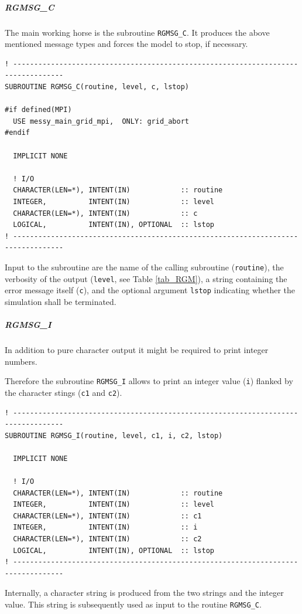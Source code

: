 \documentclass[11pt,twoside]{article}
\begin{document}
\subparagraph{RGMSG\_C\\}
The main working horse is the subroutine \verb|RGMSG_C|.
 It produces the above mentioned message types and forces the model
to stop, if necessary.
\begin{verbatim}
! ----------------------------------------------------------------------------------
SUBROUTINE RGMSG_C(routine, level, c, lstop)

#if defined(MPI)
  USE messy_main_grid_mpi,  ONLY: grid_abort
#endif

  IMPLICIT NONE

  ! I/O
  CHARACTER(LEN=*), INTENT(IN)            :: routine
  INTEGER,          INTENT(IN)            :: level
  CHARACTER(LEN=*), INTENT(IN)            :: c
  LOGICAL,          INTENT(IN), OPTIONAL  :: lstop
! ----------------------------------------------------------------------------------
\end{verbatim}
Input to the subroutine are the name of the calling subroutine 
(\verb|routine|), the verbosity of the output (\verb|level|, see Table 
\ref{tab_RGM}), a string containing the error message itself (\verb|c|),
and the optional argument \verb|lstop| indicating whether the simulation
shall be terminated.


\subparagraph{RGMSG\_I \\}
In addition to pure character output it might be required to print
integer numbers.

Therefore the subroutine \verb|RGMSG_I| allows to print  an integer
value (\verb|i|) flanked by the character stings (\verb|c1| and \verb|c2|).

\begin{verbatim}
! ----------------------------------------------------------------------------------
SUBROUTINE RGMSG_I(routine, level, c1, i, c2, lstop)

  IMPLICIT NONE

  ! I/O
  CHARACTER(LEN=*), INTENT(IN)            :: routine
  INTEGER,          INTENT(IN)            :: level
  CHARACTER(LEN=*), INTENT(IN)            :: c1
  INTEGER,          INTENT(IN)            :: i
  CHARACTER(LEN=*), INTENT(IN)            :: c2
  LOGICAL,          INTENT(IN), OPTIONAL  :: lstop
! ----------------------------------------------------------------------------------
\end{verbatim}
Internally, a character string is produced from the two strings and the 
integer value. This string is subsequently used as input to the routine
\verb|RGMSG_C|.
\end{document}
